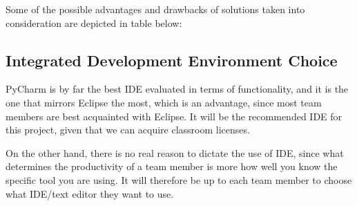 Some of the possible advantages and drawbacks of solutions taken into
consideration are depicted in table below:
\begin{table}[H] \footnotesize \center
\caption{Configuration overview}
\noindent{}
\end{table}

\subsection{Integrated Development Environment Choice}
PyCharm is by far the best IDE evaluated in terms of functionality, and it is
the one that mirrors Eclipse the most, which is an advantage, since most team
members are best acquainted with Eclipse. It will be the recommended IDE for
this project, given that we can acquire classroom licenses.

On the other hand, there is no real reason to dictate the use of IDE, since
what determines the productivity of a team member is more how well you know
the specific tool you are using. It will therefore be up to each team member
to choose what IDE/text editor they want to use.

